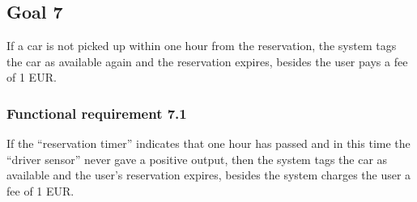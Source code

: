 \subsection{Goal 7}
If a car is not picked up within one hour from the reservation, the system tags the car as available again and the reservation expires, besides the user pays a fee of 1 EUR.

\setcounter{secnumdepth}{3}
\subsubsection{Functional requirement 7.1}
If the “reservation timer” indicates that one hour has passed and in this time the “driver sensor” never gave a positive output, then the system tags the car as available and the user’s reservation expires, besides the system charges the user a fee of 1 EUR.